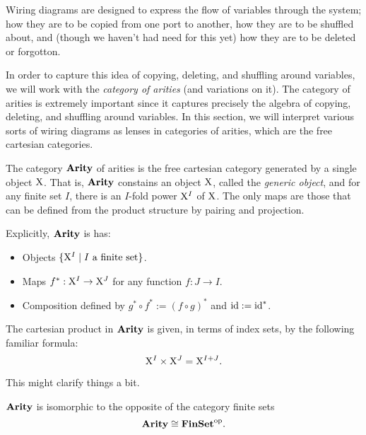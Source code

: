 \documentclass[DynamicalBook]{subfiles}
\begin{document}
 Wiring diagrams are designed to
express the flow of variables through the system; how they are to be copied from
one port to another, how they are to be shuffled about, and (though we haven't
had need for this yet) how they are to be deleted or forgotton.



In order to capture this idea of copying, deleting, and shuffling around
variables, we will work with the \emph{category of arities} (and variations on it). The
category of arities is extremely important since it captures precisely the
algebra of copying, deleting, and shuffling around variables. 
In this section, we will interpret various sorts of wiring diagrams as lenses in
categories of arities, which are the free cartesian categories.

\begin{definition}
  The category $\textbf{Arity}$ of arities is the free cartesian category generated by
  a single object $\mathrm{X}$. That is, $\textbf{Arity}$ constains an object $\mathrm{X}$, called
  the \emph{generic object}, and for any finite set $I$, there is an $I$-fold
  power $\mathrm{X}^I$ of $\mathrm{X}$. The only maps are those that can be defined from the
  product structure by pairing and projection.
  
  Explicitly, $\textbf{Arity}$ is has:
\begin{itemize}
  \item Objects $\{\mathrm{X}^{I}\mid I \text{ a finite set}\}$.
  \item Maps $f^{\ast} : \mathrm{X}^{I} \to \mathrm{X}^{J}$ for any function $f : J \to I$.
  \item Composition defined by $g^{\ast} \circ f^{\ast} := (f \circ g)^{\ast}$
    and $\mathrm{id} := \mathrm{id}^{\ast}$.
\end{itemize}
The cartesian product in $\textbf{Arity}$ is given, in terms of index sets, by the following familiar formula:
$$\mathrm{X}^I \times \mathrm{X}^J = \mathrm{X}^{I + J}.$$
\end{definition}

This might clarify things a bit.

\begin{proposition}
$\textbf{Arity}$ is isomorphic to the opposite of the category finite sets
\[\textbf{Arity}\cong\textbf{FinSet}^{\textnormal{op}}.\]
\end{proposition}
\end{document}
